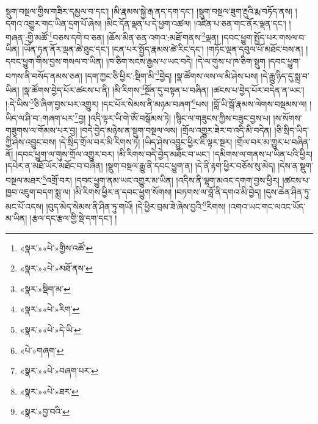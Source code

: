 སྡུག་བསྔལ་གྱིས་གཟིར་དམྱལ་བ་དང་། །མི་རྣམས་སྐྱེ་རྒ་ནད་དག་དང་། །སྡུག་བསྔལ་ཟུག་རྔུའི་རྨ་བཏོད་ནས། །དགའ་འགྱུར་གང་ཡིན་དྲག་པོ་ཞེས། །མིང་དོན་ལྡན་པ་དེ་ཕྱག་འཚལ། །འཛིན་པ་ཅན་གང་ནོར་ལྡན་དང་། །གཞན་:གྱི་མཚོ་\footnote{«སྣར་»«པེ་»གྱིས་འཚོ་}བཅས་དགེ་བ་ཅན། །ཆོས་མིན་ཅན་འགའ་:མཐོ་གནས་\footnote{«སྣར་»«པེ་»མཐོ་ནས་}ལྡན། །དབང་ཕྱུག་སྤྱོད་པར་གསལ་བ་ཡིན། །ཡོན་ཏན་ནོར་ལྡན་ཚེ་ཐུང་དང་། །ངན་པར་སྤྱོད་རྣམས་ཚེ་རིང་དང་། །གཏོང་ལྡན་དབུལ་པོ་མཐོང་བས་ན། །དབང་ཕྱུག་གིས་བྱས་གསལ་བ་ཡིན། །ཁ་ཅིག་སངས་རྒྱས་པ་ཡང་བདེ། །དེ་ལ་གུས་པ་ཁ་ཅིག་སྡུག །དབང་ཕྱུག་བཀས་ནི་བསོད་ནམས་ཅན། །དག་ཀྱང་ཅི་ཕྱིར་:སྡིག་མི་\footnote{«སྣར་»སྡིག་མ་}བྱེད། །སྣ་ཚོགས་ལས་ལ་མི་ཤེས་པས། །དེ་རྒྱུ་ཉིད་དུ་སྨྲ་བ་ཡིན། །སྣ་ཚོགས་བྱེད་པོར་ཚངས་པ་ནི། །མི་རིགས་\footnote{«སྣར་»«པེ་»རིག་}སྔོན་དུ་བསྟན་པ་བཞིན། །ཚངས་པ་བྱེད་པོར་བདེན་ན་ཡང་། །:དེ་ཡིས་\footnote{«སྣར་»«པེ་»དེ་ཡི་}ཅི་ཞིག་བྱས་པར་འགྱུར། །དང་པོར་སེམས་ནི་མཉམ་བཞག་\footnote{«པེ་»གཞག་}པས། །བློ་ཡི་སྒོ་རྣམས་ལེགས་བསྡམས་ལ། །ཡིད་ལ་ཤི་བ་:གཞག་པར་\footnote{«སྣར་»«པེ་»བཞག་པར་}བྱ། །འདི་ལྟར་ཡི་གེ་ཨོཾ་བསྒོམས་ཏེ། །སྙིང་ལ་གཟུངས་ཀྱིས་བཟུང་བྱས་པ། །ས་སོགས་གཟུགས་ལ་གོམས་པར་བྱ། །བདེ་བྱེད་མཉེས་ན་སྡུག་བསྔལ་ལས། །གྲོལ་འགྱུར་ཟེར་བ་འདི་མི་བདེན། །ཅི་སྲིད་ཡིད་ཀྱི་ཤེས་འབྱུང་བས། །དེ་སྲིད་གྲོལ་བར་མི་རིགས་ཏེ། །ཡིད་ཤེས་འབྱུང་ཕྱིར་ཇི་ལྟར་སྔར། །གྲོལ་བར་མ་གྱུར་པ་བཞིན་ནོ། །དབང་ཕྱུག་ལ་གུས་གྲོལ་འགྱུར་བར། །མི་རིགས་བདེ་བྱེད་མཐོང་བ་ཡང་། །དམིགས་ལ་གནས་པ་ཡིན་པའི་ཕྱིར། །དཔེར་ན་མཐོ་ཡོར་མཐོང་བ་བཞིན། །སྡུག་བསྔལ་རྒྱུ་ནི་དབང་ཕྱུག་ན། །དེ་ནི་རྟག་ཕྱིར་བཅོས་སུ་མེད། །དེས་ན་སྡུག་བསྔལ་མཐར་\footnote{«སྣར་»«པེ་»ཐར་}འགྲོ་བར། །དབང་ཕྱུག་ནམ་ཡང་འགྱུར་མ་ཡིན། །འདིས་ནི་ལྷག་མའང་དགག་བྱས་ཕྱིར། །ཚངས་པ་ཁྱབ་འཇུག་བདག་སྨྲ་ལ། །མི་རིགས་ཕྱིར་ན་དབང་ཕྱུག་སོགས། །བཏགས་ལ་བློ་ནི་དགའ་མི་བྱེད། །དུས་ཆེན་ཤིན་ཏུ་མང་པོ་འདས། །བུད་མེད་སེམས་ནི་ཤིན་ཏུ་གཡོ། །དེ་ཕྱིར་བྲམ་ཟེ་ཞེས་བྱའི་\footnote{«སྣར་»བྱ་བའི་}རིགས། །འགའ་ཡང་གང་ལའང་ཡོད་མ་ཡིན། །རྩལ་དང་རྩལ་གྱི་སྡེ་དག་དང་། །
